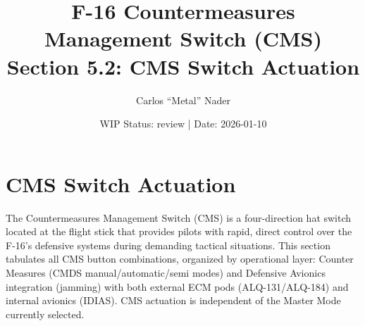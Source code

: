\documentclass[11pt,a4paper]{article}
\title{F-16 Countermeasures Management Switch (CMS)\\[0.2cm]Section 5.2: CMS Switch Actuation\\[0.2cm]{\small \bmsver{}}}
\author{Carlos ``Metal'' Nader}
\date{WIP Status: review | Date: 2026-01-10}
\begin{document}
\maketitle

\newpage

\tableofcontents

\newpage


%
%
%


\section{CMS Switch Actuation}
\label{sec:C5-S2-cms-actuation}

The Countermeasures Management Switch (CMS) is a four-direction hat switch located at the flight stick that provides pilots with rapid, direct control over the F-16's defensive systems during demanding tactical situations. This section tabulates all CMS button combinations, organized by operational layer: Counter Measures (CMDS manual/automatic/semi modes) and Defensive Avionics integration (jamming) with both external ECM pods (ALQ-131/ALQ-184) and internal avionics (IDIAS). CMS actuation is independent of the Master Mode currently selected.
\end{document}
